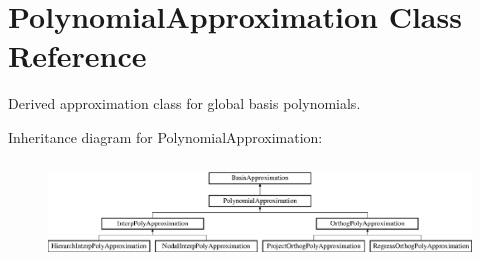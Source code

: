 \section{Polynomial\+Approximation Class Reference}
\label{classPecos_1_1PolynomialApproximation}


Derived approximation class for global basis polynomials.  


Inheritance diagram for Polynomial\+Approximation\+:\begin{figure}[H]
\begin{center}
\leavevmode
\includegraphics[height=2.666667cm]{classPecos_1_1PolynomialApproximation}
\end{center}
\end{figure}
